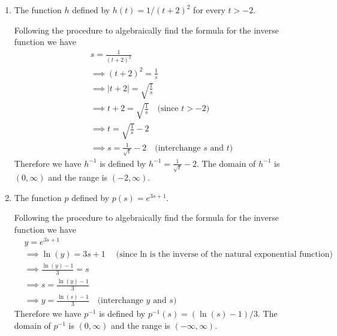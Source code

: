 \documentclass[nooutcomes]{ximera}
\begin{document}
\begin{problem}
\begin{enumerate}
    \item
      The function $h$ defined by $h(t) = 1/(t+2)^2$ for every $t > -2$.
      \begin{freeResponse}
        Following the procedure to algebraically find  the formula for the inverse function we have
        \begin{align*}
          &\mbox{} s = \frac{1}{(t+2)^2}\\
          &\implies (t+2)^2 = \frac{1}{s}\\
          &\implies |t + 2| = \sqrt{\frac{1}{s}} \\
          &\implies t + 2 = \sqrt{\frac{1}{s}} \hspace{1em} \mbox{(since $t > -2$)}\\
          &\implies t = \sqrt{\frac{1}{s}} - 2 \\
          &\implies s = \frac{1}{\sqrt{t}} - 2 \hspace{1em} \mbox{(interchange $s$ and $t$)}
        \end{align*}
        Therefore we have $h^{-1}$ is defined by $h^{-1} = \frac{1}{\sqrt{t}} - 2$.
        The domain of $h^{-1}$ is $(0, \infty)$ and the range is $(-2, \infty)$.
      \end{freeResponse}

    \item
      The function $p$ defined by $p(s) = e^{3s+1}$.
      \begin{freeResponse}
        Following the procedure to algebraically find  the formula for the inverse function we have
        \begin{align*}
          &\mbox{} y = e^{3s+1}\\
          &\implies \ln(y) = 3s + 1 \hspace{1em} \mbox{(since $\ln$ is the inverse of the natural exponential function)}\\
          &\implies \frac{\ln(y) - 1}{3} = s\\
          &\implies s = \frac{\ln(y) - 1}{3}\\
          &\implies y = \frac{\ln(s) - 1}{3} \hspace{1em} \mbox{(interchange $y$ and $s$)}
        \end{align*}
        Therefore we have $p^{-1}$ is defined by $p^{-1}(s) = (\ln(s) - 1)/3$.
        The domain of $p^{-1}$ is $(0, \infty)$ and the range is $(-\infty, \infty)$.
      \end{freeResponse}
  \end{enumerate}
\end{problem}
\end{document}
